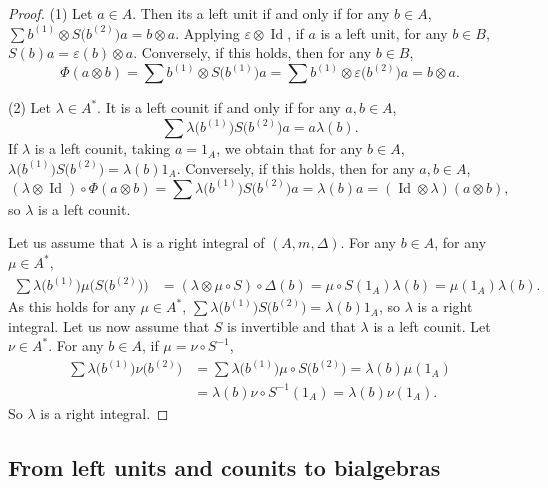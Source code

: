\documentclass[pdftex]{sigma}
\numberwithin{equation}{section}
\begin{document}
\begin{proof}
(1) Let $a\in A$. Then its a left unit if and only if for any $b\in A$, $\sum b^{(1)}\otimes S\bigl(b^{(2)}\bigr)a=b\otimes a$. Applying $\varepsilon\otimes \operatorname{Id}$, if $a$ is a left unit, for any $b\in B$, $S(b)a=\varepsilon(b)\otimes a$.
Conversely, if this holds, then for any $b\in B$,
\[\Phi(a\otimes b)=\sum b^{(1)}\otimes S\bigl(b^{(1)}\bigr)a=\sum b^{(1)}\otimes \varepsilon\bigl(b^{(2)}\bigr) a=b\otimes a.\]

(2) Let $\lambda \in A^*$. It is a left counit if and only if for any $a,b\in A$,
\[\sum \lambda\bigl(b^{(1)}\bigr)S\bigl(b^{(2)}\bigr)a=a\lambda(b).\]
If $\lambda$ is a left counit, taking $a=1_A$, we obtain that for any $b\in A$,
$\lambda\bigl(b^{(1)}\bigr)S\bigl(b^{(2)}\bigr)=\lambda(b)1_A$. Conversely, if this holds, then for any $a,b\in A$,{\samepage
\[(\lambda\otimes \operatorname{Id})\circ \Phi(a\otimes b)=\sum \lambda\bigl(b^{(1)}\bigr)S\bigl(b^{(2)}\bigr)a=\lambda(b)a=(\operatorname{Id} \otimes \lambda)(a\otimes b),\]
so $\lambda$ is a left counit.}

Let us assume that $\lambda$ is a right integral of $(A,m,\Delta)$. For any $b\in A$, for any $\mu\in A^*$,
\begin{align*}
\sum \lambda\bigl(b^{(1)}\bigr)\mu\bigl(S\bigl(b^{(2)}\bigr)\bigr)&=(\lambda\otimes \mu\circ S)\circ \Delta(b)=\mu\circ S(1_A)\lambda(b)=\mu(1_A)\lambda(b).
\end{align*}
As this holds for any $\mu\in A^*$, $\sum \lambda\bigl(b^{(1)}\bigr)S\bigl(b^{(2)}\bigr)=\lambda(b)1_A$, so $\lambda$ is a right integral. Let us now assume that $S$ is invertible and that $\lambda$ is a left counit.
Let $\nu \in A^*$. For any $b\in A$, if $\mu=\nu \circ S^{-1}$,
\begin{align*}
\sum \lambda\bigl(b^{(1)}\bigr)\nu\bigl(b^{(2)}\bigr)&=\sum \lambda\bigl(b^{(1)}\bigr)\mu\circ S\bigl(b^{(2)}\bigr)=\lambda(b)\mu(1_A)\\
&=\lambda(b)\nu\circ S^{-1}(1_A)=\lambda(b)\nu(1_A).
\end{align*}
So $\lambda$ is a right integral.
\end{proof}


\subsection{From left units and counits to bialgebras}
\end{document}
